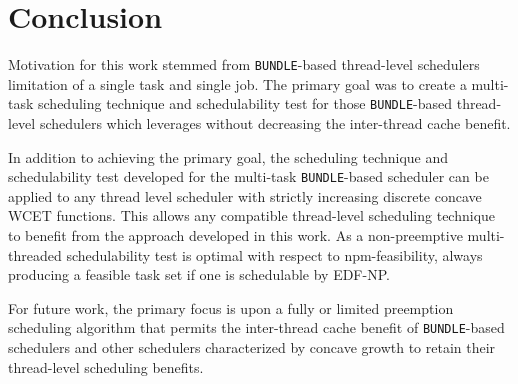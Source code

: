 \section{Conclusion}\label{sec:conclusion}

Motivation for this work stemmed from \texttt{BUNDLE}-based
thread-level schedulers limitation of a single task and single
job. The primary goal was to create a multi-task scheduling technique
and schedulability test for those \texttt{BUNDLE}-based thread-level
schedulers which leverages without decreasing the inter-thread cache
benefit.

In addition to achieving the primary goal, the scheduling technique
and schedulability test developed for the multi-task
\texttt{BUNDLE}-based scheduler can be applied to any thread level
scheduler with strictly increasing discrete concave WCET
functions. This allows any compatible thread-level scheduling
technique to benefit from the \tpj{} approach developed in this
work. As a non-preemptive multi-threaded schedulability test \tpj{} is
optimal with respect to npm-feasibility, always producing a feasible
task set if one is schedulable by EDF-NP.

For future work, the primary focus is upon a fully or limited preemption
scheduling algorithm that permits the inter-thread cache benefit of
\texttt{BUNDLE}-based schedulers and other schedulers
characterized by concave growth to retain their thread-level
scheduling benefits.
